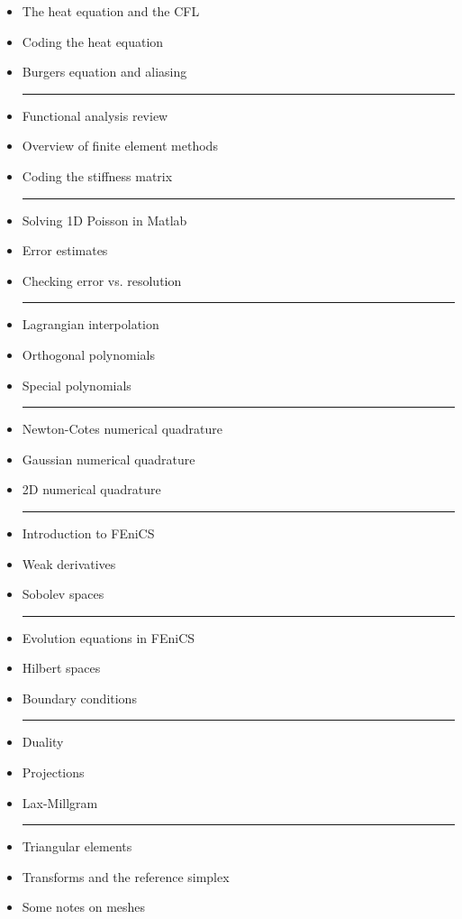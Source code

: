 \documentclass[margin]{res}
\theoremstyle{plain}
\theoremstyle{definition}
\theoremstyle{remark}
\begin{document}
\begin{resume}
{\begin{itemize}
\hrule

\item The heat equation and the CFL
\item Coding the heat equation
\item Burgers equation and aliasing

\hrule

\item Functional analysis review
\item Overview of finite element methods
\item Coding the stiffness matrix

\hrule

\item Solving 1D Poisson in Matlab
\item Error estimates
\item Checking error vs. resolution

\hrule

\item Lagrangian interpolation
\item Orthogonal polynomials
\item Special polynomials

\hrule

\item Newton-Cotes numerical quadrature
\item Gaussian numerical quadrature
\item 2D numerical quadrature

\hrule

\item Introduction to FEniCS
\item Weak derivatives
\item Sobolev spaces

\hrule

\item Evolution equations in FEniCS
\item Hilbert spaces
\item Boundary conditions

\hrule


\item Duality
\item Projections
\item Lax-Millgram

\hrule

\item Triangular elements
\item Transforms and the reference simplex
\item Some notes on meshes


\end{itemize}}
\end{resume}
\end{document}
